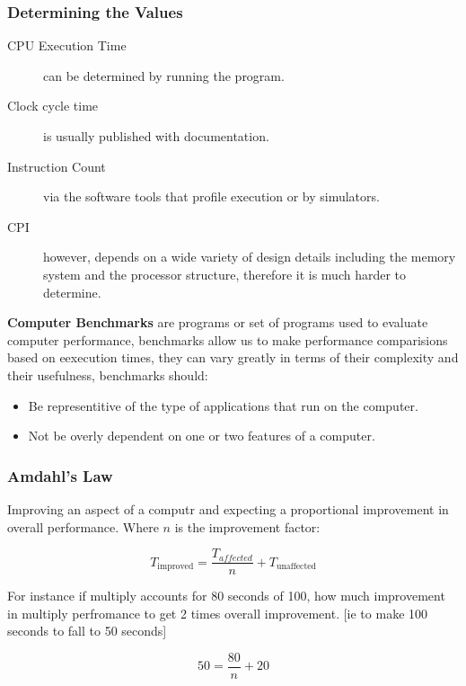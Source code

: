 \documentclass[11pt,a4paper,twocolumn]{book}
\begin{document}
\subsubsection{Determining the Values}

\begin{description}
\item[CPU Execution Time] can be determined by running the program.
\item[Clock cycle time] is usually published with documentation.
\item[Instruction Count] via the software tools that profile execution or by simulators.
\item[CPI] however, depends on a wide variety of design details including the memory system and the processor structure, therefore it is much harder to determine.
\end{description}

\textbf{Computer Benchmarks} are programs or set of programs used to evaluate computer performance, benchmarks allow us to make performance comparisions based on eexecution times, they can vary greatly in terms of their complexity and their usefulness, benchmarks should:

\begin{itemize}
\item Be representitive of the type of applications that run on the computer.
\item Not be overly dependent on one or two features of a computer.
\end{itemize}

\subsubsection{Amdahl's Law}

Improving an aspect of a computr and expecting a proportional improvement in overall performance. Where $n$ is the improvement factor:

\begin{equation}
T_{\text{improved}} = \frac{T_{affected}}{n} + T_{\text{unaffected}}
\end{equation}

For instance if multiply accounts for 80 seconds of 100, how much improvement in multiply perfromance to get 2 times overall improvement. [ie to make 100 seconds to fall to 50 seconds]

\begin{equation}
50 = \frac{80}{n} + 20
\end{equation}
\end{document}
